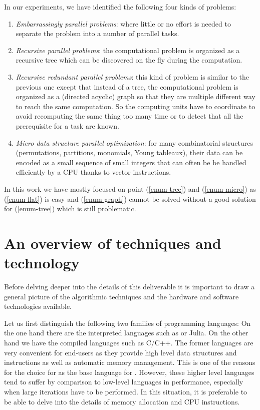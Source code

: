 \documentclass{deliverablereport}
\begin{document}
In our experiments, we have identified the following four kinds of problems:
\begin{enumerate}
\item\label{enum-flat} \emph{Embarrassingly parallel problems}: where
  little or no effort is needed to separate the problem into a number of
  parallel tasks.
\item\label{enum-tree} \emph{Recursive parallel problems}: the computational
  problem is organized as a recursive tree which can be discovered on the fly
  during the computation.
\item\label{enum-graph} \emph{Recursive redundant parallel problems}: this
  kind of problem is similar to the previous one except that instead of a
  tree, the computational problem is organized as a (directed acyclic) graph
  so that they are multiple different way to reach the same computation. So the
  computing units have to coordinate to avoid recomputing the same thing too
  many time or to detect that all the prerequisite for a task are known.
\item\label{enum-micro} \emph{Micro data structure parallel optimization}:
  for many combinatorial structures (permutations, partitions, monomials, Young
  tableaux), their data can be encoded as a small sequence of small integers
  that can often be be handled efficiently by a CPU thanks to vector instructions.
\end{enumerate}
In this work we have mostly focused on point (\ref{enum-tree}) and
(\ref{enum-micro}) as (\ref{enum-flat}) is easy and (\ref{enum-graph}) cannot
be solved without a good solution for (\ref{enum-tree}) which is still
problematic.


\section{An overview of techniques and technology}

Before delving deeper into the details of this deliverable it is important to
draw a general picture of the algorithmic techniques and the hardware and
software technologies available.

Let us first distinguish the following two families of programming
languages: On the one hand there are the interpreted languages
such as \Python or Julia. On the other hand we have the compiled languages
such as C/C++. The former languages are very convenient for end-users as
they provide high level data structures and instructions as well as automatic
memory management. This is one of the reasons for the choice for \Python as the
base language for \Sage. However, these higher level languages tend to suffer
by comparison to low-level languages in performance, especially when large
iterations have to be performed. In this situation, it is preferable to be able
to delve into the details of memory allocation and CPU instructions.
\end{document}
